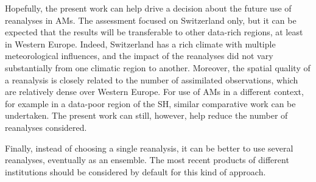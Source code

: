 \documentclass[smallextended]{svjour3}       %
\begin{document}
	Hopefully, the present work can help drive a decision about the future use of reanalyses in AMs. The assessment focused on Switzerland only, but it can be expected that the results will be transferable to other data-rich regions, at least in Western Europe. Indeed, Switzerland has a rich climate with multiple meteorological influences, and the impact of the reanalyses did not vary substantially from one climatic region to another. Moreover, the spatial quality of a reanalysis is closely related to the number of assimilated observations, which are relatively dense over Western Europe. For use of AMs in a different context, for example in a data-poor region of the SH, similar comparative work can be undertaken. The present work can still, however, help reduce the number of reanalyses considered.
	
	Finally, instead of choosing a single reanalysis, it can be better to use several reanalyses, eventually as an ensemble. The most recent products of different institutions should be considered by default for this kind of approach.
	
	
	
\end{document}
